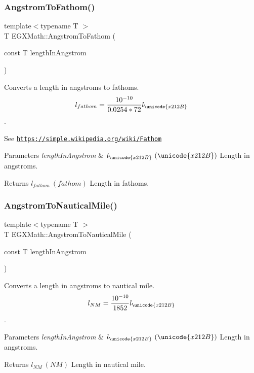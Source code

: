 \subsubsection{\texorpdfstring{Angstrom\+To\+Fathom()}{AngstromToFathom()}}
{\footnotesize\ttfamily template$<$typename T $>$ \\
T E\+G\+X\+Math\+::\+Angstrom\+To\+Fathom (\begin{DoxyParamCaption}\item[{const T}]{length\+In\+Angstrom }\end{DoxyParamCaption})}



Converts a length in angstroms to fathoms. \[ l_{fathom}= \frac{10^{-10}}{0.0254 * 72} l_{\unicode{x212B}} \]. 

See \href{https://simple.wikipedia.org/wiki/Fathom}{\tt https\+://simple.\+wikipedia.\+org/wiki/\+Fathom} 
\begin{DoxyParams}{Parameters}
{\em length\+In\+Angstrom} & $ l_{\unicode{x212B}}\ (\unicode{x212B})$ Length in angstroms. \\
\hline
\end{DoxyParams}
\begin{DoxyReturn}{Returns}
$ l_{fathom}\ (fathom)$ Length in fathoms. 
\end{DoxyReturn}
\mbox{\label{group___e_g_x_math-_conversions-_length_conversions-_non-_s_i-_angstrom-_nautical_ga4be465819cdcbfd7da046440844f5d82}} 
\subsubsection{\texorpdfstring{Angstrom\+To\+Nautical\+Mile()}{AngstromToNauticalMile()}}
{\footnotesize\ttfamily template$<$typename T $>$ \\
T E\+G\+X\+Math\+::\+Angstrom\+To\+Nautical\+Mile (\begin{DoxyParamCaption}\item[{const T}]{length\+In\+Angstrom }\end{DoxyParamCaption})}



Converts a length in angstroms to nautical mile. \[ l_{NM}= \frac{10^{-10}}{1852} l_{\unicode{x212B}} \]. 


\begin{DoxyParams}{Parameters}
{\em length\+In\+Angstrom} & $ l_{\unicode{x212B}}\ (\unicode{x212B})$ Length in angstroms. \\
\hline
\end{DoxyParams}
\begin{DoxyReturn}{Returns}
$ l_{NM}\ (NM)$ Length in nautical mile. 
\end{DoxyReturn}
